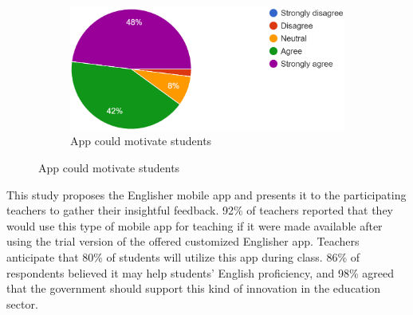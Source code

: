 \documentclass[sn-mathphys,Numbered]{sn-jnl}%
\theoremstyle{thmstyleone}%
\theoremstyle{thmstyletwo}%
\theoremstyle{thmstylethree}%
\begin{document}
\begin{figure}[h!]
\begin{subfigure}{0.44\textwidth}
    \label{cv}
\end{subfigure}
\hfill
\begin{subfigure}{0.47\textwidth}
    \includegraphics[width=\textwidth]{app_motivates.png}
    \caption{App could motivate students}
    \label{umass}
\end{subfigure}        
\label{cv_umass}
\end{figure}

This study proposes the Englisher mobile app and presents it to the participating teachers to gather their insightful feedback. 92\% of teachers reported that they would use this type of mobile app for teaching if it were made available after using the trial version of the offered customized Englisher app. Teachers anticipate that 80\% of students will utilize this app during class. 86\% of respondents believed it may help students' English proficiency, and 98\% agreed that the government should support this kind of innovation in the education sector. 
\end{document}
